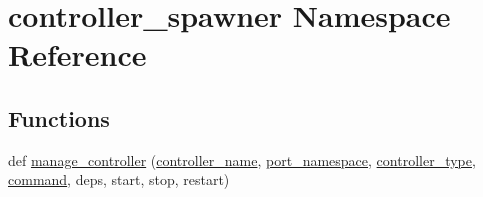 \hypertarget{namespacecontroller__spawner}{}\section{controller\+\_\+spawner Namespace Reference}
\label{namespacecontroller__spawner}
\subsection*{Functions}
\begin{DoxyCompactItemize}
\item 
def \hyperlink{namespacecontroller__spawner_a35e2c94db3e9253a989ac159ad9077c3}{manage\+\_\+controller} (\hyperlink{namespacecontroller__spawner_a1250390c451d11dbad2361ac6a4d201a}{controller\+\_\+name}, \hyperlink{namespacecontroller__spawner_a831390a07e2261094656c09e0d262c14}{port\+\_\+namespace}, \hyperlink{namespacecontroller__spawner_a6aa09cb289adac00daaf52560e8c93ad}{controller\+\_\+type}, \hyperlink{namespacecontroller__spawner_a982ec8d1714fc314b5e85fc8d377abdb}{command}, deps, start, stop, restart)
\end{DoxyCompactItemize}
